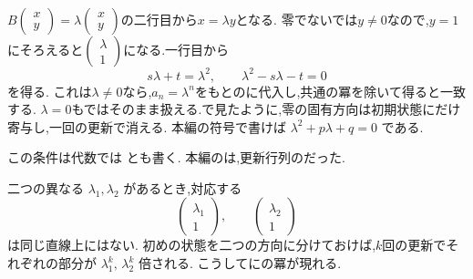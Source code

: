 $B\begin{pmatrix}x\\y\end{pmatrix}=\lambda\begin{pmatrix}x\\y\end{pmatrix}$の二行目から$x=\lambda y$となる.
零でないでは$y\ne0$なので,$y=1$にそろえると$\begin{pmatrix}\lambda\\1\end{pmatrix}$になる.一行目から
\[
  s\lambda+t=\lambda^2,
  \qquad
  \lambda^2-s\lambda-t=0
\]
を得る.
これは$\lambda\ne0$なら,$a_n=\lambda^n$をもとのに代入し,共通の冪を除いて得ると一致する.
$\lambda=0$もではそのまま扱える.で見たように,零の固有方向は初期状態にだけ寄与し,一回の更新で消える.
本編の符号で書けば $\lambda^2+p\lambda+q=0$ である.

この条件は代数では
\BookMathLayout{\[
    \det(\lambda I-B)
    =
    \det\begin{pmatrix}\lambda-s&-t\\-1&\lambda\end{pmatrix}
    =\lambda^2-s\lambda-t=0
  \]}{
  \[
    \begin{aligned}
      \det(\lambda I-B)&=\det\begin{pmatrix}\lambda-s&-t\\-1&\lambda\end{pmatrix}\\
      &=\lambda^2-s\lambda-t=0
    \end{aligned}
  \]
}
とも書く.
本編のは,更新行列のだった.

二つの異なる $\lambda_1,\lambda_2$ があるとき,対応する
\[
  \begin{pmatrix}\lambda_1\\1\end{pmatrix},
  \qquad
  \begin{pmatrix}\lambda_2\\1\end{pmatrix}
\]
は同じ直線上にはない.
初めの状態を二つの方向に分けておけば,$k$回の更新でそれぞれの部分が $\lambda_1^k,\,\lambda_2^k$ 倍される.
こうしてにの冪が現れる.

